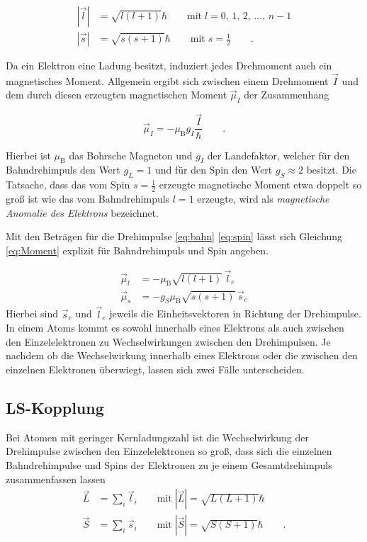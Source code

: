\begin{align}
|\vec{l}| & = \sqrt{l(l+1)}\hbar \qquad \text{mit} \; l = 0,\, 1,\, 2,\, ... ,\, n-1 \label{eq:bahn}\\
|\vec{s}| & = \sqrt{s(s+1)}\hbar \qquad \text{mit} \; s = \frac{1}{2} \qquad . \label{eq:spin}
\end{align}

Da ein Elektron eine Ladung besitzt, induziert jedes Drehmoment auch ein magnetisches Moment. Allgemein ergibt sich zwischen einem Drehmoment $\vec{I}$ und dem durch diesen erzeugten magnetischen
Moment $\vec{\mu}_I$ der Zusammenhang

\begin{equation}
\vec{\mu}_I = - \mu_{\text{B}}g_I\frac{\vec{I}}{\hbar} \qquad . \label{eq:Moment}
\end{equation}

Hierbei ist $\mu_\text{B}$ das Bohrsche Magneton und $g_I$ der Landefaktor, welcher für den Bahndrehimpuls den Wert $g_L=1$ und für den Spin den Wert $g_S \approx 2$ besitzt.
Die Tatsache, dass das vom Spin $s=\frac{1}{2}$ erzeugte magnetische Moment etwa doppelt so groß ist wie das vom Bahndrehimpuls $l=1$ erzeugte, wird als \textit{magnetische Anomalie des Elektrons}
bezeichnet.

Mit den Beträgen für die Drehimpulse \eqref{eq:bahn} \eqref{eq:spin} lässt sich Gleichung \eqref{eq:Moment} explizit für Bahndrehimpuls und Spin angeben. 

\begin{align}
\vec{\mu}_l &= - \mu_{\text{B}}\sqrt{l(l+1)}\,\vec{l}_e \\
\vec{\mu}_s &= - g_S \mu_{\text{B}}\sqrt{s(s+1)}\,\vec{s}_e
\end{align}
Hierbei sind $\vec{s}_e$ und $\vec{l}_e$ jeweils die Einheitsvektoren in Richtung der Drehimpulse.
\\

In einem Atoms kommt es sowohl innerhalb eines Elektrons als auch zwischen den Einzelelektronen zu Wechselwirkungen zwischen den Drehimpulsen.
Je nachdem ob die Wechselwirkung innerhalb eines Elektrons oder die zwischen den einzelnen Elektronen überwiegt, lassen sich zwei Fälle unterscheiden.

\subsection*{LS-Kopplung}
Bei Atomen mit geringer Kernladungszahl ist die Wechselwirkung der Drehimpulse zwischen den Einzelelektronen so groß, dass sich die einzelnen Bahndrehimpulse und Spins der Elektronen zu je einem Gesamtdrehimpuls
zusammenfassen lassen
\begin{align}
\vec{L} &= \sum_i \vec{l}_i \qquad \text{mit}\; |\vec{L}| = \sqrt{L(L+1)}\hbar \\
\vec{S} &= \sum_i \vec{s}_i \qquad \text{mit}\; |\vec{S}| = \sqrt{S(S+1)}\hbar \qquad .
\end{align}

